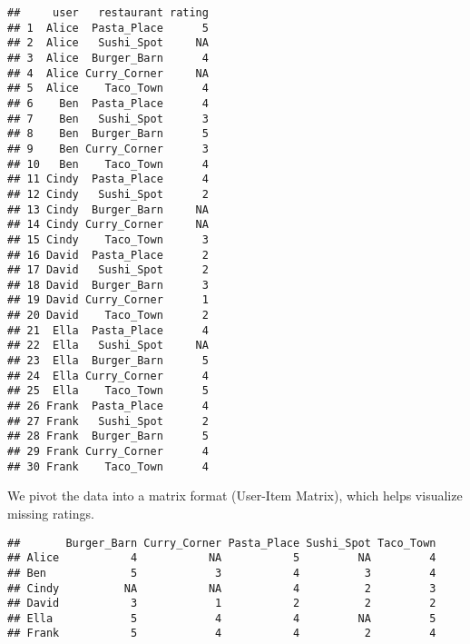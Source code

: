\documentclass[
]{article}
\newenvironment{Shaded}{\begin{snugshade}}{\end{snugshade}}
\newcommand{\AttributeTok}[1]{\textcolor[rgb]{0.13,0.29,0.53}{#1}}
\newcommand{\CommentTok}[1]{\textcolor[rgb]{0.56,0.35,0.01}{\textit{#1}}}
\newcommand{\DecValTok}[1]{\textcolor[rgb]{0.00,0.00,0.81}{#1}}
\newcommand{\FunctionTok}[1]{\textcolor[rgb]{0.13,0.29,0.53}{\textbf{#1}}}
\newcommand{\NormalTok}[1]{#1}
\newcommand{\OtherTok}[1]{\textcolor[rgb]{0.56,0.35,0.01}{#1}}
\newcommand{\SpecialCharTok}[1]{\textcolor[rgb]{0.81,0.36,0.00}{\textbf{#1}}}
\newcommand{\StringTok}[1]{\textcolor[rgb]{0.31,0.60,0.02}{#1}}
\begin{document}
\begin{verbatim}
##     user   restaurant rating
## 1  Alice  Pasta_Place      5
## 2  Alice   Sushi_Spot     NA
## 3  Alice  Burger_Barn      4
## 4  Alice Curry_Corner     NA
## 5  Alice    Taco_Town      4
## 6    Ben  Pasta_Place      4
## 7    Ben   Sushi_Spot      3
## 8    Ben  Burger_Barn      5
## 9    Ben Curry_Corner      3
## 10   Ben    Taco_Town      4
## 11 Cindy  Pasta_Place      4
## 12 Cindy   Sushi_Spot      2
## 13 Cindy  Burger_Barn     NA
## 14 Cindy Curry_Corner     NA
## 15 Cindy    Taco_Town      3
## 16 David  Pasta_Place      2
## 17 David   Sushi_Spot      2
## 18 David  Burger_Barn      3
## 19 David Curry_Corner      1
## 20 David    Taco_Town      2
## 21  Ella  Pasta_Place      4
## 22  Ella   Sushi_Spot     NA
## 23  Ella  Burger_Barn      5
## 24  Ella Curry_Corner      4
## 25  Ella    Taco_Town      5
## 26 Frank  Pasta_Place      4
## 27 Frank   Sushi_Spot      2
## 28 Frank  Burger_Barn      5
## 29 Frank Curry_Corner      4
## 30 Frank    Taco_Town      4
\end{verbatim}

We pivot the data into a matrix format (User-Item Matrix), which helps
visualize missing ratings.

\begin{Shaded}
\end{Shaded}

\begin{verbatim}
##       Burger_Barn Curry_Corner Pasta_Place Sushi_Spot Taco_Town
## Alice           4           NA           5         NA         4
## Ben             5            3           4          3         4
## Cindy          NA           NA           4          2         3
## David           3            1           2          2         2
## Ella            5            4           4         NA         5
## Frank           5            4           4          2         4
\end{verbatim}
\end{document}
